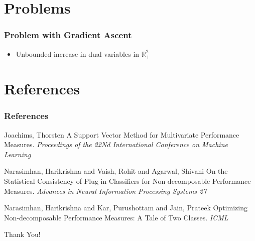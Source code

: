 \documentclass{beamer}
\begin{document}
\section{Problems}
\begin{frame}
	\frametitle{Problem with Gradient Ascent}
	\begin{itemize}
	\item Unbounded increase in dual variables in $\mathbb{R}^2_+$
	\end{itemize}
\end{frame}
\section{References} %

\begin{frame}
	\frametitle{References}
	\footnotesize{
		\begin{thebibliography}{99} %
			 Joachims, Thorsten
			\newblock A Support Vector Method for Multivariate Performance Measures.
			\newblock \emph{Proceedings of the 22Nd International Conference on Machine Learning}
			
			
			 Narasimhan, Harikrishna and Vaish, Rohit and Agarwal, Shivani
			\newblock On the Statistical Consistency of Plug-in Classifiers for Non-decomposable Performance Measures.
			\newblock \emph{Advances in Neural Information Processing Systems 27}
			
			 Narasimhan, Harikrishna and Kar, Purushottam and Jain, Prateek
			\newblock Optimizing Non-decomposable Performance Measures: A Tale of Two Classes.
			\newblock \emph{ICML}
			
			
			
		\end{thebibliography}
	}
\end{frame}


\begin{frame}
	\Huge{\centerline{Thank You!}}
\end{frame}

\end{document}
